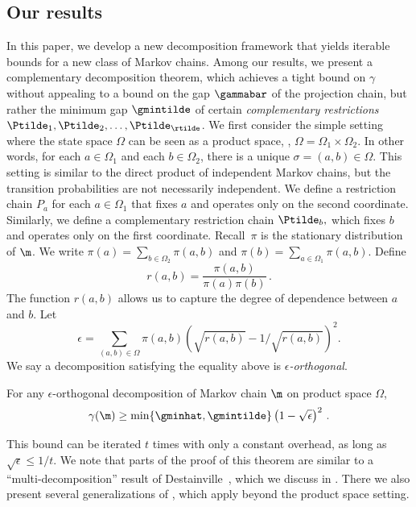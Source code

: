 \documentclass{toc}
\begin{document}
\subsection{Our results}

In this paper, we develop a new decomposition framework that yields 
iterable bounds for a new class of Markov chains. Among our results, we 
present a complementary decomposition theorem, which achieves a tight 
bound on $\gamma$ without appealing to a bound on the gap $\gammabar$ 
of the projection chain, but rather the minimum gap $\gmintilde$ of 
certain \emph{complementary restrictions} 
$\Ptilde_1,\Ptilde_2,\ldots,\Ptilde_{\rtilde}$. We first consider the 
simple setting where the state space $\Omega$ can be seen as a product 
space, \ie,  $\Omega=\Omega_1\times\Omega_2$. In other words, for each 
$a\in\Omega_1$ and each $b\in\Omega_2$, there is a unique 
$\sigma=(a,b)\in \Omega$. This setting is similar to the direct product 
of independent Markov chains, but the transition probabilities are not 
necessarily independent. We define a restriction chain $P_a$ for each 
$a\in\Omega_1$ that fixes $a$ and operates only on the second 
coordinate.  Similarly, we define a complementary restriction chain 
$\Ptilde_b,$ which fixes $b$ and operates only on the first coordinate. 
Recall~$\pi$ is the stationary distribution of $\m$. We write $\pi(a) = 
\sum_{b\in \Omega_2}\pi(a,b)$ and $\pi(b) = \sum_{a\in 
\Omega_1}\pi(a,b)$.  Define \[r(a,b) = \frac{\pi(a,b)}{\pi(a)\pi(b)}\,.\] 
The function $r(a,b)$ allows us to capture the degree of dependence 
between $a$ and $b$.  Let
\begin{equation}\label{eq:eps}
\epsilon = \sum_{(a,b)\in\Omega}\pi(a,b)\left(\sqrt{r(a,b)} -
1/\sqrt{r(a,b)}\right)^2.
\end{equation}
We say a decomposition satisfying the equality above is \emph{$\epsilon$-orthogonal}. 
%
%
%
%
%

\begin{theorem}\label{thm:productspaces}
For any $\epsilon$-orthogonal decomposition of Markov chain $\m$ on 
product space $\Omega$,
\[ \gamma(\m) \geq \min\{\gminhat, \gmintilde\}\left(1 -\sqrt{\epsilon}\right)^2\,.\]
\end{theorem}

\noindent This bound can be iterated $t$ times with 
only a constant overhead, as long as $\sqrt{\epsilon}\leq 1/t$.
We note that parts of the proof of this theorem are similar
to a ``multi-decomposition'' result of Destainville~\cite{Dest03},
which we discuss in .  There we also
present several generalizations of , 
which apply beyond the product space setting.
\end{document}
